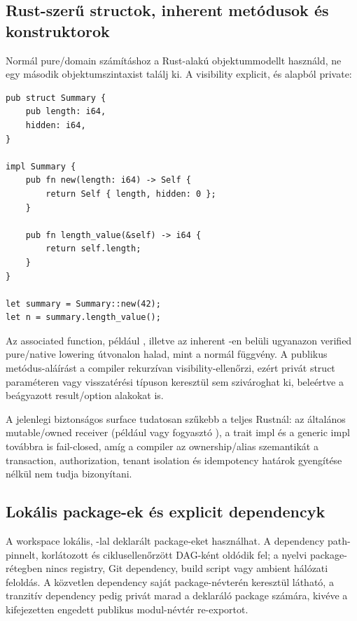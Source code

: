 \subsection*{Rust-szerű structok, inherent metódusok és konstruktorok}

Normál pure/domain számításhoz a Rust-alakú objektummodellt használd, ne egy második objektumszintaxist találj ki. A visibility explicit, és alapból private:

\begin{lstlisting}[language=Velran]
pub struct Summary {
    pub length: i64,
    hidden: i64,
}

impl Summary {
    pub fn new(length: i64) -> Self {
        return Self { length, hidden: 0 };
    }

    pub fn length_value(&self) -> i64 {
        return self.length;
    }
}

let summary = Summary::new(42);
let n = summary.length_value();
\end{lstlisting}

Az associated function, például , illetve az inherent -en belüli  ugyanazon verified pure/native lowering útvonalon halad, mint a normál függvény. A publikus metódus-aláírást a compiler rekurzívan visibility-ellenőrzi, ezért privát struct paraméteren vagy visszatérési típuson keresztül sem szivároghat ki, beleértve a beágyazott result/option alakokat is.

A jelenlegi biztonságos surface tudatosan szűkebb a teljes Rustnál: az általános mutable/owned receiver (például  vagy fogyasztó ), a trait impl és a generic impl továbbra is fail-closed, amíg a compiler az ownership/alias szemantikát a transaction, authorization, tenant isolation és idempotency határok gyengítése nélkül nem tudja bizonyítani.

\subsection*{Lokális package-ek és explicit dependencyk}

A workspace lokális, -lal deklarált package-eket használhat. A dependency path-pinnelt, korlátozott és ciklusellenőrzött DAG-ként oldódik fel; a nyelvi package-rétegben nincs registry, Git dependency, build script vagy ambient hálózati feloldás. A közvetlen dependency saját package-névterén keresztül látható, a tranzitív dependency pedig privát marad a deklaráló package számára, kivéve a kifejezetten engedett publikus modul-névtér re-exportot.

